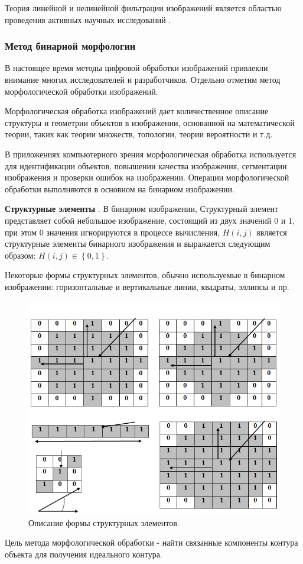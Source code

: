 Теория линейной и нелинейной фильтрации изображений является областью проведения активных научных исследований \cite{Sizikov2011,Sizikov260,Sizikov2012}.
\subsubsection{Метод бинарной морфологии}
В настоящее время методы цифровой обработки изображений привлекли внимание многих исследователей и разработчиков. Отдельно отметим метод морфологической обработки изображений.

Морфологическая обработка изображений дает количественное описание структуры и геометрии объектов в изображении, основанной на математической теории, таких как теории множеств, топологии, теории вероятности и т.д.

В приложениях компьютерного зрения морфологическая обработка используется для идентификации объектов, повышении качества изображения, сегментации изображения и проверки ошибок на изображении. Операции морфологической обработки выполняются в основном на бинарном изображении.

\textbf{Структурные элементы} \cite{Burger2009}.  В бинарном изображении, Структурный элемент представляет собой небольшое изображение, состоящий из двух значений $0$ и $1$, при этом $0$ значения игнорируются в процессе вычисления, $H\left(i,j\right)$ является структурные элементы бинарного изображения и выражается следующим образом: $H\left(i,j\right) \in \left\{0,1\right\}$.

Некоторые формы структурных элементов, обычно используемые в бинарном изображении: горизонтальные и вертикальные линии, квадраты, эллипсы и пр.

\begin{figure}[ht!]
\centering
\includegraphics [scale=0.8] {images/h8.png}
\begin{center}
\caption{Описание формы структурных элементов.} \label{img8}
\end{center}
\end{figure}
Цель метода морфологической обработки - найти связанные компоненты контура объекта для получения идеального контура.

